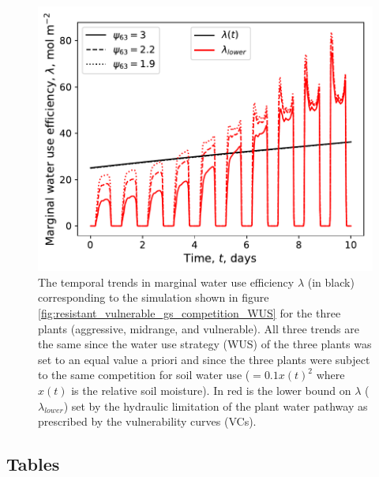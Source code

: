 \documentclass[utf8]{frontiersSCNS} %
\begin{document}
\begin{figure}[h]
    \centering
    \includegraphics[scale=0.75]{lam_resistant_vulnerable_competition_WUS.pdf}
    \caption{The temporal trends in marginal water use efficiency $\lambda$ (in black) corresponding to the simulation shown in figure \ref{fig:resistant_vulnerable_gs_competition_WUS} for the three plants (aggressive, midrange, and vulnerable). All three trends are the same since the water use strategy (WUS) of the three plants was set to an equal value a priori and since the three plants were subject to the same competition for soil water use ($= 0.1 x(t)^2$ where $x(t)$ is the relative soil moisture). In red is the lower bound on $\lambda$ ($\lambda_{lower}$) set by the hydraulic limitation of the plant water pathway as prescribed by the vulnerability curves (VCs).}
    \label{fig:resistant_vulnerable_lam_competition_WUS}
\end{figure}

\clearpage


\subsection{Tables}
\end{document}
